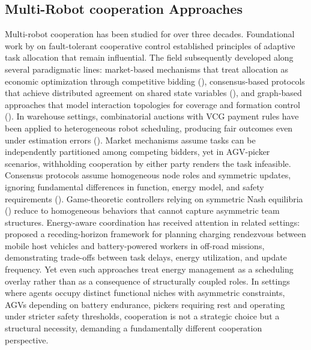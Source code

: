 \documentclass[Afour,sageh,times]{sagej}
\begin{document}
\subsection{Multi-Robot cooperation Approaches}
Multi-robot cooperation has been studied for over three decades. Foundational work by \cite{parker1998ALLIANCE} on fault-tolerant cooperative control established principles of adaptive task allocation that remain influential. The field subsequently developed along several paradigmatic lines: market-based mechanisms that treat allocation as economic optimization through competitive bidding (\cite{gerkey2004formal, dias2006Marketbased}), consensus-based protocols that achieve distributed agreement on shared state variables (\cite{olfati-saber2007Consensus, ren2008Consensus, amirkhani2022Consensus}), and graph-based approaches that model interaction topologies for coverage and formation control (\cite{cortes2004Coverage, spanos2005Dynamic}). In warehouse settings, combinatorial auctions with VCG payment rules have been applied to heterogeneous robot scheduling, producing fair outcomes even under estimation errors (\cite{kattepur2021aspects}). Market mechanisms assume tasks can be independently partitioned among competing bidders, yet in AGV-picker scenarios, withholding cooperation by either party renders the task infeasible. Consensus protocols assume homogeneous node roles and symmetric updates, ignoring fundamental differences in function, energy model, and safety requirements (\cite{amirkhani2022Consensus}). Game-theoretic controllers relying on symmetric Nash equilibria (\cite{nash1950Equilibrium}) reduce to homogeneous behaviors that cannot capture asymmetric team structures. Energy-aware coordination has received attention in related settings: \cite{goulet2025dynamic} proposed a receding-horizon framework for planning charging rendezvous between mobile host vehicles and battery-powered workers in off-road missions, demonstrating trade-offs between task delays, energy utilization, and update frequency. Yet even such approaches treat energy management as a scheduling overlay rather than as a consequence of structurally coupled roles. In settings where agents occupy distinct functional niches with asymmetric constraints, AGVs depending on battery endurance, pickers requiring rest and operating under stricter safety thresholds, cooperation is not a strategic choice but a structural necessity, demanding a fundamentally different cooperation perspective.
\end{document}
